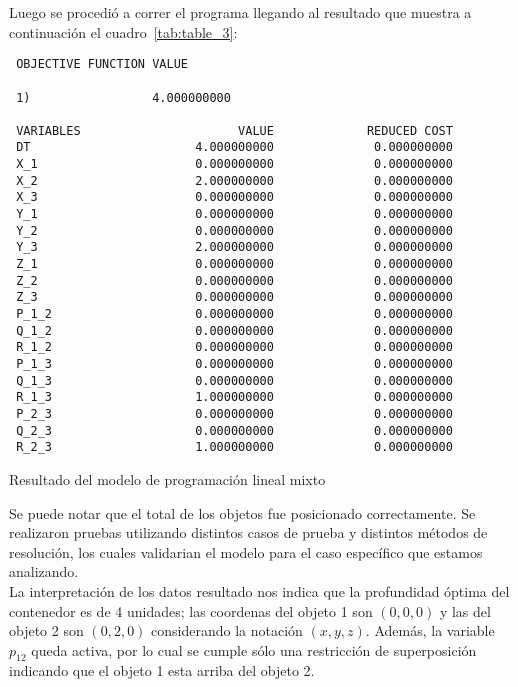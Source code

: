 Luego se procedió a correr el programa llegando al resultado
que muestra a continua\-ción el cuadro~\ref{tab:table_3}: \\

\begin{table}[!htb]
\scriptsize
\begin{verbatim}
 OBJECTIVE FUNCTION VALUE

 1)                 4.000000000

 VARIABLES                      VALUE             REDUCED COST
 DT                       4.000000000              0.000000000
 X_1                      0.000000000              0.000000000
 X_2                      2.000000000              0.000000000
 X_3                      0.000000000              0.000000000
 Y_1                      0.000000000              0.000000000
 Y_2                      0.000000000              0.000000000
 Y_3                      2.000000000              0.000000000
 Z_1                      0.000000000              0.000000000
 Z_2                      0.000000000              0.000000000
 Z_3                      0.000000000              0.000000000
 P_1_2                    0.000000000              0.000000000
 Q_1_2                    0.000000000              0.000000000
 R_1_2                    0.000000000              0.000000000
 P_1_3                    0.000000000              0.000000000
 Q_1_3                    0.000000000              0.000000000
 R_1_3                    1.000000000              0.000000000
 P_2_3                    0.000000000              0.000000000
 Q_2_3                    0.000000000              0.000000000
 R_2_3                    1.000000000              0.000000000
\end{verbatim}
\caption{Resultado del modelo de programación lineal mixto}
\label{tab:table_3}
\end{table}
\normalsize

Se puede notar que el total de los objetos fue posicionado correctamente.
Se realizaron pruebas utilizando distintos casos de prueba y distintos métodos
de resolución, los cuales validarian el modelo para el caso específico que
estamos analizando. \\

La interpretación de los datos resultado nos indica que la profundidad óptima
del contenedor es de 4 unidades; las coordenas del objeto 1 son $(0, 0, 0)$ y
las del objeto 2 son $(0, 2, 0)$ considerando la notación $(x, y, z)$. Además,
la variable $p_{12}$ queda activa, por lo cual se cumple sólo una restricción
de superposición indicando que el objeto 1 esta arriba del objeto 2.
